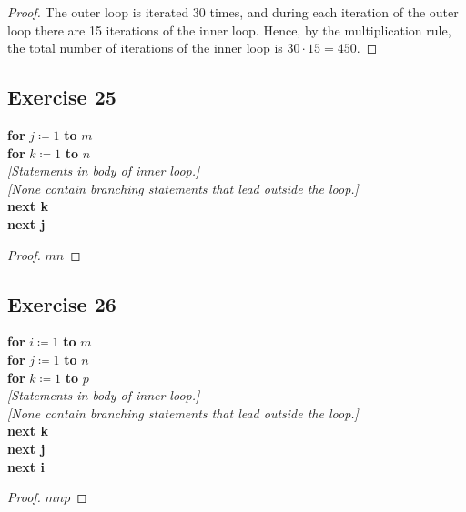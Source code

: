 \documentclass[14pt]{extarticle}
\begin{document}
\begin{proof}
The outer loop is iterated 30 times, and during each iteration of the outer loop there are 15 iterations of the 
inner loop. Hence, by the multiplication rule, the total number of iterations of the inner loop is 
\(30 \cdot 15 = 450\).
\end{proof}

\subsection{Exercise 25}
\begin{tabbing}
{\bf for} \= \(j \coloneqq 1\) {\bf to} $m$ \\
          \> {\bf for} \= \(k \coloneqq 1\) {\bf to} $n$ \\
          \>           \> {\it [Statements in body of inner loop.]} \\
          \>           \> {\it [None contain branching statements that lead outside the loop.]} \\
          \> {\bf next k} \\
{\bf next j}
\end{tabbing}

\begin{proof}
\(mn\)
\end{proof}

\subsection{Exercise 26}
\begin{tabbing}
{\bf for} \= \(i \coloneqq 1\) {\bf to} $m$ \\
          \> {\bf for} \= \(j \coloneqq 1\) {\bf to} $n$ \\
          \>           \> {\bf for} \= \(k \coloneqq 1\) {\bf to} $p$ \\
          \>           \>           \> {\it [Statements in body of inner loop.]} \\
          \>           \>           \> {\it [None contain branching statements that lead outside the loop.]} \\
          \>           \> {\bf next k} \\
          \> {\bf next j} \\
{\bf next i}
\end{tabbing}

\begin{proof}
\(mnp\)
\end{proof}
\end{document}
